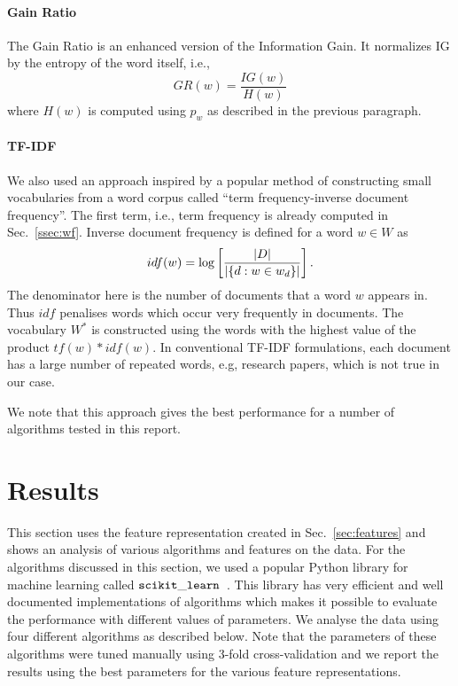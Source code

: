 \documentclass[11pt, letterpaper, conference, final, twocolumn]{ieeeconf}
\begin{document}
\paragraph{Gain Ratio}
\label{ssec:gr}

The Gain Ratio is an enhanced version of the Information Gain. It normalizes IG by the entropy of the word itself, i.e.,
$$
GR(w) = \frac{IG(w)}{H(w)}
$$
where $H(w)$ is computed using $p_w$ as described in the previous paragraph.

\paragraph{TF-IDF}
\label{ssec:tfidf}
We also used an approach inspired by a popular method of constructing small vocabularies from a word corpus called ``term frequency-inverse document frequency''. The first term, i.e., term frequency is already computed in Sec.~\ref{ssec:wf}. Inverse document frequency is defined for a word $w \in W$ as
$$
idf(w) = \log \left[ \frac{\left| D \right|}{\left| \{d: w \in w_d \} \right|} \right].
$$
The denominator here is the number of documents that a word $w$ appears in. Thus $idf$ penalises words which occur very frequently in documents. The vocabulary $W^*$ is constructed using the words with the highest value of the product $tf(w) * idf(w)$. In conventional TF-IDF formulations, each document has a large number of repeated words, e.g, research papers, which is not true in our case.

We note that this approach gives the best performance for a number of algorithms tested in this report.

\section{Results}
\label{sec:results}

This section uses the feature representation created in Sec.~\ref{sec:features} and shows an analysis of various algorithms and features on the data.
For the algorithms discussed in this section, we used a popular Python library for machine learning called $\tt scikit\_learn$~\cite{scikit-learn}. This library has very efficient and well documented implementations of algorithms which makes it possible to evaluate the performance with different values of parameters. We analyse the data using four different algorithms as described below. Note that the parameters of these algorithms were tuned manually using $3$-fold cross-validation and we report the results using the best parameters for the various feature representations.
\end{document}
